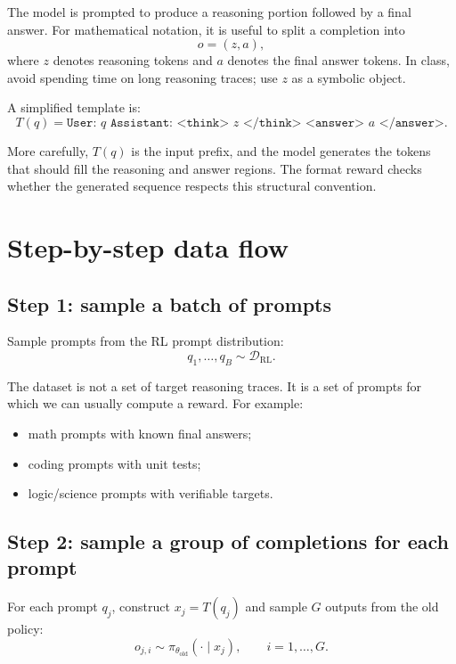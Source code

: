 \documentclass[11pt]{article}
\newcommand{\D}{\mathcal{D}}
\newcommand{\old}{\mathrm{old}}
\newcommand{\RL}{\mathrm{RL}}
\begin{document}
The model is prompted to produce a reasoning portion followed by a final answer. For mathematical notation, it is useful to split a completion into
\[
 o = (z,a),
\]
where $z$ denotes reasoning tokens and $a$ denotes the final answer tokens. In class, avoid spending time on long reasoning traces; use $z$ as a symbolic object.

A simplified template is:
\[
T(q)=\texttt{User: }q\texttt{ Assistant: <think> } z \texttt{ </think> <answer> } a \texttt{ </answer>}.
\]

More carefully, $T(q)$ is the input prefix, and the model generates the tokens that should fill the reasoning and answer regions. The format reward checks whether the generated sequence respects this structural convention.

\section{Step-by-step data flow}

\subsection{Step 1: sample a batch of prompts}

Sample prompts from the RL prompt distribution:
\begin{equation}
q_1,\ldots,q_B \sim \D_{\RL}.
\end{equation}

The dataset is not a set of target reasoning traces. It is a set of prompts for which we can usually compute a reward. For example:
\begin{itemize}[leftmargin=*]
  \item math prompts with known final answers;
  \item coding prompts with unit tests;
  \item logic/science prompts with verifiable targets.
\end{itemize}

\subsection{Step 2: sample a group of completions for each prompt}

For each prompt $q_j$, construct $x_j=T(q_j)$ and sample $G$ outputs from the old policy:
\begin{equation}
 o_{j,i} \sim \pi_{\theta_{\old}}(\cdot\mid x_j),
 \qquad i=1,\ldots,G.
\end{equation}
\end{document}
